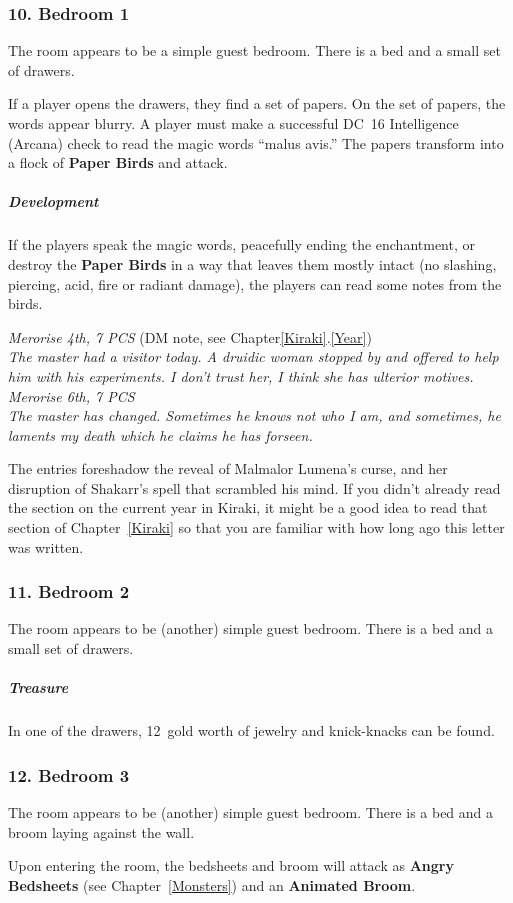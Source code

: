 \subsubsection{10. Bedroom 1}
\begin{DndReadAloud}
    The room appears to be a simple guest bedroom. There is a bed and a small set of drawers.
\end{DndReadAloud}
If a player opens the drawers, they find a set of papers. On the set of papers, the words appear blurry. A player must make a successful DC~16 Intelligence (Arcana) check to read the magic words ``malus avis.'' The papers transform into a flock of \textbf{Paper Birds} and attack.
\subparagraph{Development} If the players speak the magic words, peacefully ending the enchantment, or destroy the \textbf{Paper Birds} in a way that leaves them mostly intact (no slashing, piercing, acid, fire or radiant damage), the players can read some notes from the birds.
\begin{DndReadAloud}
    \textit{Merorise 4th, 7 PCS} (DM note, see Chapter\ref{Kiraki}.\ref{Year})\\
    \textit{The master had a visitor today. A druidic woman stopped by and offered to help him with his experiments. I don't trust her, I think she has ulterior motives.}\\
    \textit{Merorise 6th, 7 PCS\\
    The master has changed. Sometimes he knows not who I am, and sometimes, he laments my death which he claims he has forseen.}
\end{DndReadAloud}
The entries foreshadow the reveal of Malmalor Lumena's curse, and her disruption of Shakarr's spell that scrambled his mind. If you didn't already read the section on the current year in Kiraki, it might be a good idea to read that section of Chapter~\ref{Kiraki} so that you are familiar with how long ago this letter was written.
\subsubsection{11. Bedroom 2}
\begin{DndReadAloud}
    The room appears to be (another) simple guest bedroom. There is a bed and a small set of drawers.
\end{DndReadAloud}
\subparagraph{Treasure} In one of the drawers, 12~gold worth of jewelry and knick-knacks can be found.
\subsubsection{12. Bedroom 3}
\begin{DndReadAloud}
    The room appears to be (another) simple guest bedroom. There is a bed and a broom laying against the wall.
\end{DndReadAloud}
Upon entering the room, the bedsheets and broom will attack as \textbf{Angry Bedsheets} (see Chapter~\ref{Monsters}) and an \textbf{Animated Broom}.
